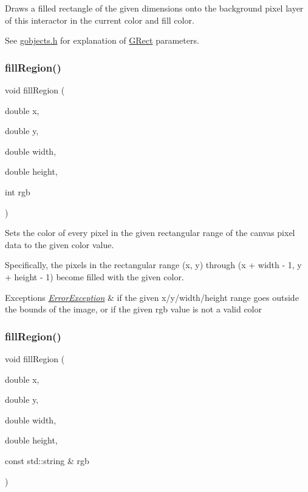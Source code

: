 Draws a filled rectangle of the given dimensions onto the background pixel layer of this interactor in the current color and fill color. 

See \mbox{\hyperlink{gobjects_8h_source}{gobjects.\+h}} for explanation of \mbox{\hyperlink{classGRect}{G\+Rect}} parameters. \mbox{\label{classGCanvas_af4146bdcb26135b739b9b4f13db03435}} 
\subsubsection{\texorpdfstring{fill\+Region()}{fillRegion()}\hspace{0.1cm}{\footnotesize\ttfamily [1/2]}}
{\footnotesize\ttfamily void fill\+Region (\begin{DoxyParamCaption}\item[{double}]{x,  }\item[{double}]{y,  }\item[{double}]{width,  }\item[{double}]{height,  }\item[{int}]{rgb }\end{DoxyParamCaption})\hspace{0.3cm}{\ttfamily [virtual]}}



Sets the color of every pixel in the given rectangular range of the canvas pixel data to the given color value. 

Specifically, the pixels in the rectangular range (x, y) through (x + width -\/ 1, y + height -\/ 1) become filled with the given color. 
\begin{DoxyExceptions}{Exceptions}
{\em \mbox{\hyperlink{classErrorException}{Error\+Exception}}} & if the given x/y/width/height range goes outside the bounds of the image, or if the given rgb value is not a valid color \\
\hline
\end{DoxyExceptions}
\mbox{\label{classGCanvas_a762c611a5065687112018e7a0ab10c84}} 
\subsubsection{\texorpdfstring{fill\+Region()}{fillRegion()}\hspace{0.1cm}{\footnotesize\ttfamily [2/2]}}
{\footnotesize\ttfamily void fill\+Region (\begin{DoxyParamCaption}\item[{double}]{x,  }\item[{double}]{y,  }\item[{double}]{width,  }\item[{double}]{height,  }\item[{const std\+::string \&}]{rgb }\end{DoxyParamCaption})\hspace{0.3cm}{\ttfamily [virtual]}}



